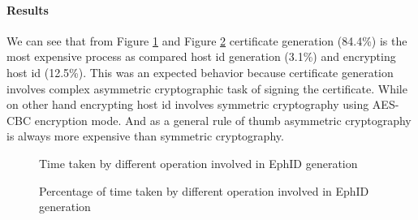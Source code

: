 \paragraph{Results}
We can see that from Figure \ref{fig:perf_ephid} and Figure \ref{fig:perf_ephid_dist} certificate generation (84.4\%) is the most expensive process as compared host id generation (3.1\%) and encrypting host id (12.5\%). This was an expected behavior because certificate generation involves complex asymmetric cryptographic task of signing the certificate. While on other hand encrypting host id involves symmetric cryptography using AES-CBC encryption mode. And as a general rule of thumb asymmetric cryptography is always more expensive than symmetric cryptography.
\begin{figure}[th!!]
\centering
\noindent
{}
\decoRule
\caption[EphID Generation Ops]{Time taken by different operation involved in EphID generation}
\label{fig:perf_ephid}
\end{figure}

\begin{figure}[th!!]
\centering
\noindent
{}
\decoRule
\caption[EphID Generation Ops Distribution]{Percentage of time taken by different operation involved in EphID generation}
\label{fig:perf_ephid_dist}
\end{figure}

